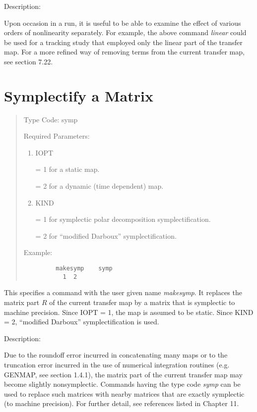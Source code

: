 \vspace{5mm}
     Description:
\vspace{2mm}

     Upon occasion in a \Mary run, it is useful to be able to examine
the effect of various orders of nonlinearity separately.  For example, the
above command {\em linear } could be used for a tracking study that employed only
the linear part of the transfer map.  For a more refined way of removing terms from the current transfer map, see section 7.22.

\newpage
\section{Symplectify a Matrix}
\begin{quotation}
\noindent     Type Code:  symp 
\vspace{5mm}

\noindent Required Parameters:
\begin{enumerate}
      \item  IOPT

             = 1 for a static map.

             = 2 for a dynamic (time dependent) map.

      \item  KIND

             = 1 for symplectic polar decomposition symplectification.

             = 2 for ``modified Darboux'' symplectification.
\end{enumerate}

\vspace{5mm}
\noindent Example:
\begin{verbatim}
         makesymp    symp
           1  2
\end{verbatim}
\end{quotation}
This specifies a command with the user given name {\em makesymp}.  It replaces
the matrix part $R$ of the current transfer map by a matrix that is
symplectic to machine precision.  Since IOPT = 1, the map is assumed to be
static.  Since KIND = 2, ``modified Darboux''
symplectification is used.

\vspace{5mm}
     Description:
\vspace{2mm}

Due to the roundoff error incurred in concatenating many maps or to the
truncation error incurred in the use of numerical integration routines
(e.g. GENMAP, see section 1.4.1), the matrix part of the current transfer
map may become slightly nonsymplectic.  Commands having the type code
{\em symp} can be used to replace such matrices with nearby matrices that
are exactly symplectic (to machine precision).  For further detail, see
references listed in Chapter 11.


